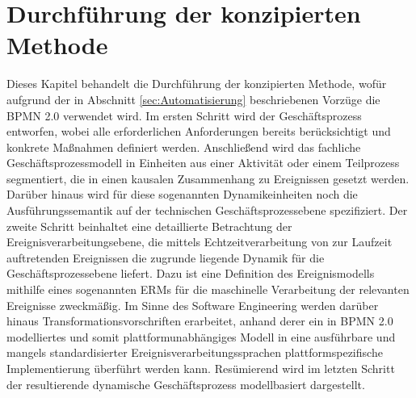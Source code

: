\chapter{Durchführung der konzipierten Methode}\label{ch:Durchfuehrung}
Dieses Kapitel behandelt die Durchführung der konzipierten Methode, wofür aufgrund der in Abschnitt \ref{sec:Automatisierung} beschriebenen Vorzüge die BPMN 2.0 verwendet wird.
Im ersten Schritt wird der Geschäftsprozess entworfen, wobei alle erforderlichen Anforderungen bereits berücksichtigt und konkrete Maßnahmen definiert werden. 
Anschließend wird das fachliche Geschäftsprozessmodell in Einheiten aus einer Aktivität oder einem Teilprozess segmentiert, die in einen kausalen Zusammenhang zu Ereignissen gesetzt werden. 
Darüber hinaus wird für diese sogenannten Dynamikeinheiten noch die Ausführungssemantik auf der technischen Geschäftsprozessebene spezifiziert.
Der zweite Schritt beinhaltet eine detaillierte Betrachtung der Ereignisverarbeitungsebene, die mittels Echtzeitverarbeitung von zur Laufzeit auftretenden Ereignissen die zugrunde liegende Dynamik für die Geschäftsprozessebene liefert. 
Dazu ist eine Definition des Ereignismodells mithilfe eines sogenannten \ac{ERM}s für die maschinelle Verarbeitung der relevanten Ereignisse zweckmäßig. 
Im Sinne des Software Engineering werden darüber hinaus Transformationsvorschriften erarbeitet, anhand derer ein in BPMN 2.0 modelliertes und somit plattformunabhängiges Modell in eine ausführbare und mangels standardisierter Ereignisverarbeitungssprachen plattformspezifische Implementierung überführt werden kann.
Resümierend wird im letzten Schritt der resultierende dynamische Geschäftsprozess modellbasiert dargestellt.




